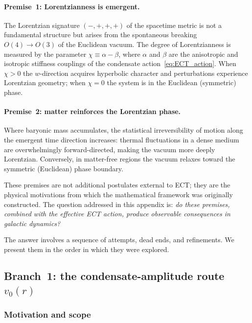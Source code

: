 \documentclass[11pt,a4paper]{article}
\numberwithin{equation}{section}
\begin{document}
\paragraph{Premise~1: Lorentzianness is emergent.}
The Lorentzian signature $(-,+,+,+)$ of the spacetime metric
is not a fundamental structure but arises from the spontaneous
breaking $O(4) \to O(3)$ of the Euclidean vacuum. The degree
of Lorentzianness is measured by the parameter
$\chi \equiv \alpha - \beta$, where $\alpha$ and $\beta$ are
the anisotropic and isotropic stiffness couplings of the
condensate action~\eqref{eq:ECT_action}. When $\chi > 0$ the
$w$-direction acquires hyperbolic character and perturbations
experience Lorentzian geometry; when $\chi = 0$ the system is
in the Euclidean (symmetric) phase.

\paragraph{Premise~2: matter reinforces the Lorentzian phase.}
Where baryonic mass accumulates, the statistical irreversibility
of motion along the emergent time direction increases: thermal
fluctuations in a dense medium are overwhelmingly
forward-directed, making the vacuum more deeply Lorentzian.
Conversely, in matter-free regions the vacuum relaxes toward
the symmetric (Euclidean) phase boundary.

These premises are not additional postulates external to ECT;
they are the physical motivations from which the mathematical
framework was originally constructed. The question addressed
in this appendix is: \emph{do these premises, combined with
the effective ECT action, produce observable consequences in
galactic dynamics?}

The answer involves a sequence of attempts, dead ends, and
refinements. We present them in the order in which they were
explored.


\subsection{Branch~1: the condensate-amplitude route $v_0(r)$}
\label{app:lof:branch1}

\subsubsection{Motivation and scope}
\end{document}
